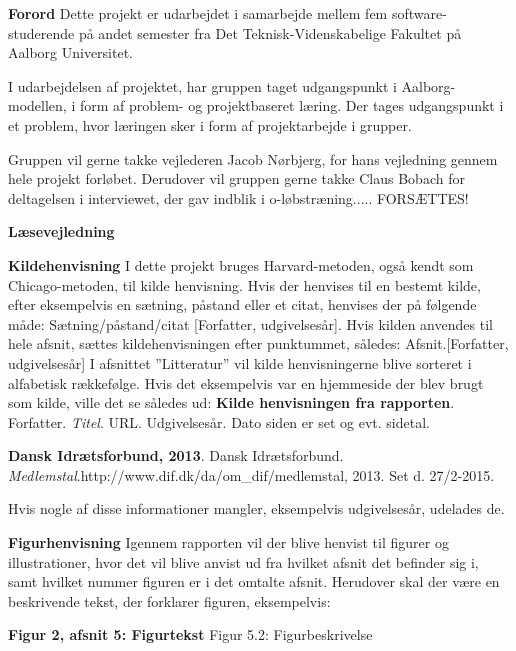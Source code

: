 {\Huge\textbf{Forord}}
Dette projekt er udarbejdet i samarbejde mellem fem software-studerende på andet semester fra Det Teknisk-Videnskabelige Fakultet på Aalborg Universitet. 

I udarbejdelsen af projektet, har gruppen taget udgangspunkt i Aalborg-modellen, i form af problem- og projektbaseret læring. Der tages udgangspunkt i et problem, hvor læringen sker i form af projektarbejde i grupper.

Gruppen vil gerne takke vejlederen Jacob Nørbjerg, for hans vejledning gennem hele projekt forløbet. Derudover vil gruppen gerne takke Claus Bobach for deltagelsen i interviewet, der gav indblik i o-løbstræning..... FORSÆTTES!

{\Huge\textbf{Læsevejledning}}

{\Large\textbf{Kildehenvisning}}\newline
I dette projekt bruges Harvard-metoden, også kendt som Chicago-metoden, til kilde henvisning. Hvis der henvises til en bestemt kilde, efter eksempelvis en sætning, påstand eller et citat, henvises der på følgende måde: Sætning/påstand/citat [Forfatter, udgivelsesår].\newline
Hvis kilden anvendes til hele afsnit, sættes kildehenvisningen efter punktummet, således: Afsnit.[Forfatter, udgivelsesår]\newline
I afsnittet ”Litteratur” vil kilde henvisningerne blive sorteret i alfabetisk rækkefølge. Hvis det eksempelvis var en hjemmeside der blev brugt som kilde, ville det se således ud: \newline
\textbf{Kilde henvisningen fra rapporten}. Forfatter. \textit{Titel}. URL. Udgivelsesår. Dato siden er set og evt. sidetal.

\textbf{Dansk Idrætsforbund, 2013}. Dansk Idrætsforbund. \textit{Medlemstal}.\newline http://www.dif.dk/da/om\_dif/medlemstal, 2013. Set d. 27/2-2015.

Hvis nogle af disse informationer mangler, eksempelvis udgivelsesår, udelades de.

{\Large\textbf{Figurhenvisning}} \newline
Igennem rapporten vil der blive henvist til figurer og illustrationer, hvor det vil blive anvist ud fra hvilket afsnit det befinder sig i, samt hvilket nummer figuren er i det omtalte afsnit. Herudover skal der være en beskrivende tekst, der forklarer figuren, eksempelvis:
\begin{flushleft}
	{\LARGE\textbf{Figur 2, afsnit 5: Figurtekst}}\newline
	Figur 5.2: Figurbeskrivelse
\end{flushleft}
